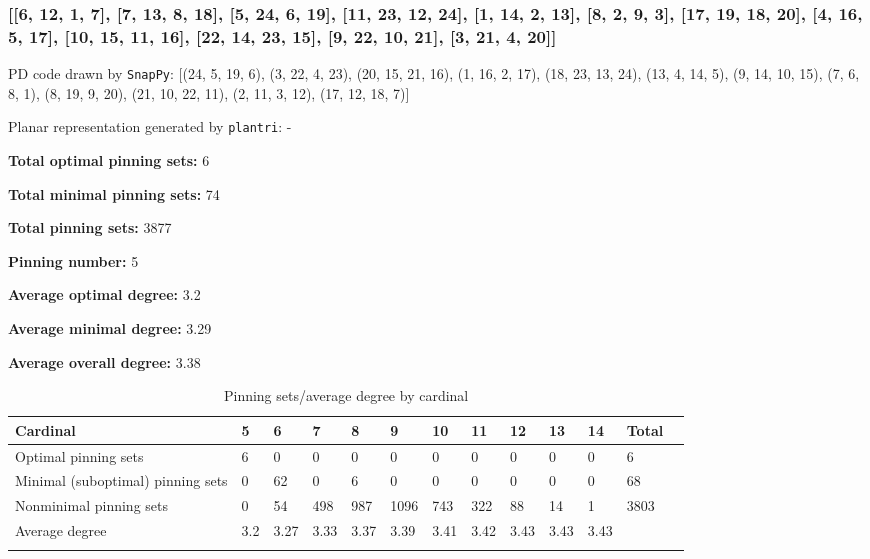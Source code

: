 \documentclass{article}%
\begin{document}
\subsubsection{[[6, 12, 1, 7], [7, 13, 8, 18], [5, 24, 6, 19], [11, 23, 12, 24], [1, 14, 2, 13], [8, 2, 9, 3], [17, 19, 18, 20], [4, 16, 5, 17], [10, 15, 11, 16], [22, 14, 23, 15], [9, 22, 10, 21], [3, 21, 4, 20]]}

{\small\noindent PD code drawn by \texttt{SnapPy}: [(24, 5, 19, 6), (3, 22, 4, 23), (20, 15, 21, 16), (1, 16, 2, 17), (18, 23, 13, 24), (13, 4, 14, 5), (9, 14, 10, 15), (7, 6, 8, 1), (8, 19, 9, 20), (21, 10, 22, 11), (2, 11, 3, 12), (17, 12, 18, 7)]}

{\small\noindent Planar representation generated by \texttt{plantri}: -}

\begin{multicols}{2}
{\normalsize \noindent\textbf{Total optimal pinning sets:} 6

\noindent\textbf{Total minimal pinning sets:} 74

\noindent\textbf{Total pinning sets:} 3877

\noindent\textbf{Pinning number:} 5

}
\columnbreak

{\normalsize \noindent\textbf{Average optimal degree:} 3.2

\noindent\textbf{Average minimal degree:} 3.29

\noindent\textbf{Average overall degree:} 3.38

}
\end{multicols}

\begin{table}[ht]
	\caption{Pinning sets/average degree by cardinal}
	\centering
	\renewcommand{\arraystretch}{1.5}
	\begin{tabularx}{\textwidth}{lXXXXXXXXXXXX}
		\toprule
			Cardinal & 5 & 6 & 7 & 8 & 9 & 10 & 11 & 12 & 13 & 14 & Total\\
			\hline
			Optimal pinning sets & 6 & 0 & 0 & 0 & 0 & 0 & 0 & 0 & 0 & 0 & 6 \\
			Minimal (suboptimal) pinning sets & 0 & 62 & 0 & 6 & 0 & 0 & 0 & 0 & 0 & 0 & 68 \\
			Nonminimal pinning sets & 0 & 54 & 498 & 987 & 1096 & 743 & 322 & 88 & 14 & 1 & 3803 \\
			Average degree & 3.2 & 3.27 & 3.33 & 3.37 & 3.39 & 3.41 & 3.42 & 3.43 & 3.43 & 3.43 &  \\
		\bottomrule \\ 
	\end{tabularx}
\end{table}
\end{document}
